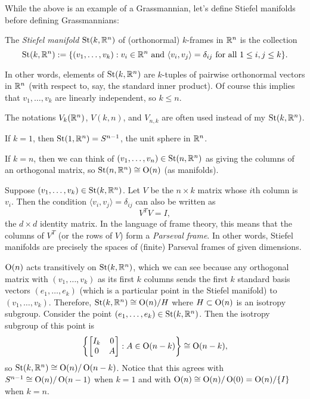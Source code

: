 While the above is an example of a Grassmannian, let's define Stiefel manifolds before defining Grassmannians:

\begin{definition}\label{def:stiefel}
	The \emph{Stiefel manifold} $\operatorname{St}(k,\mathbb{R}^n)$ of (orthonormal) $k$-frames in $\mathbb{R}^n$ is the collection
	\[
		\operatorname{St}(k,\mathbb{R}^n) := \{(v_1, \dots , v_k) : v_i \in \mathbb{R}^n \text{ and } \langle v_i, v_j \rangle = \delta_{ij} \text{ for all } 1 \leq i , j \leq k\}.
	\]
\end{definition}

In other words, elements of $\operatorname{St}(k,\mathbb{R}^n)$ are $k$-tuples of pairwise orthonormal vectors in $\mathbb{R}^n$ (with respect to, say, the standard inner product). Of course this implies that $v_1, \dots , v_k$ are linearly independent, so $k \leq n$.

\begin{remark}
	The notations $V_k(\mathbb{R}^n)$, $V(k,n)$, and $V_{n,k}$ are often used instead of my $\operatorname{St}(k,\mathbb{R}^n)$.
\end{remark}

\begin{example}
	If $k=1$, then $\operatorname{St}(1,\mathbb{R}^n) = S^{n-1}$, the unit sphere in $\mathbb{R}^n$.
\end{example}

\begin{example}
	If $k=n$, then we can think of $(v_1, \dots , v_n) \in \operatorname{St}(n,\mathbb{R}^n)$ as giving the columns of an orthogonal matrix, so $\operatorname{St}(n,\mathbb{R}^n) \cong \operatorname{O}(n)$ (as manifolds).
\end{example}

\begin{remark}
	Suppose $(v_1, \dots , v_k) \in \operatorname{St}(k,\mathbb{R}^n)$. Let $V$ be the $n \times k$ matrix whose $i$th column is $v_i$. Then the condition $\langle v_i, v_j \rangle = \delta_{ij}$ can also be written as
	\[
		V^T V = I,
	\]
	the $d \times d$ identity matrix. In the language of frame theory, this means that the columns of $V^T$ (or the rows of $V$) form a \emph{Parseval frame}. In other words, Stiefel manifolds are precisely the spaces of (finite) Parseval frames of given dimensions.
\end{remark}

$\operatorname{O}(n)$ acts transitively on $\operatorname{St}(k,\mathbb{R}^n)$, which we can see because any orthogonal matrix with $(v_1, \dots , v_k)$ as its first $k$ columns sends the first $k$ standard basis vectors $(e_1, \dots , e_k)$ (which is a particular point in the Stiefel manifold) to $(v_1, \dots , v_k)$. Therefore, $\operatorname{St}(k,\mathbb{R}^n) \cong \operatorname{O}(n)/H$ where $H \subset \operatorname{O}(n)$ is an isotropy subgroup. Consider the point $(e_1, \dots , e_k) \in \operatorname{St}(k, \mathbb{R}^n)$. Then the isotropy subgroup of this point is
\[
	\left\{ \begin{bmatrix} I_k & 0 \\ 0 & A \end{bmatrix}: A \in \operatorname{O}(n-k)\right\} \cong \operatorname{O}(n-k),
\]
so $\operatorname{St}(k,\mathbb{R}^n) \cong \operatorname{O}(n)/\operatorname{O}(n-k)$. Notice that this agrees with $S^{n-1} \cong \operatorname{O}(n)/\operatorname{O}(n-1)$ when $k=1$ and with $\operatorname{O}(n) \cong \operatorname{O}(n)/\operatorname{O}(0) = \operatorname{O}(n)/\{I\}$ when $k=n$.

